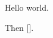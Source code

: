 \documentclass{article}
\begin{document}
\let\everypar\mytoks {}
Hello world.

Then [\the\mytoks].
\end{document}
